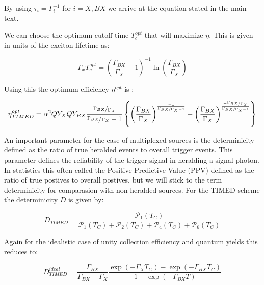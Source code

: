 \documentclass[reprint,onecolumn]{revtex4-1}
\begin{document}
By using $\tau_{i}=\Gamma_{i}^{-1}$ for $i=X,BX$ we arrive at the
equation stated in the main text.

We can choose the optimum cutoff time $T_{c}^{opt}$ that will maximize
$\eta$. This is given in units of the exciton lifetime as:

\begin{equation*}
\Gamma_{x}T_{c}^{opt}=\left(\frac{\Gamma_{BX}}{\Gamma_{X}}-1\right)^{-1}\ln\left(\frac{\Gamma_{BX}}{\Gamma_{X}}\right)\label{eq:tcopt}
\end{equation*}

Using this the optimum efficiency $\eta^{opt}$ is :

\begin{equation*}
\eta_{TIMED}^{opt}=\alpha^{2}QY_{X}QY_{BX}\frac{\nicefrac{\Gamma_{BX}}{\Gamma_{X}}}{\nicefrac{\Gamma_{BX}}{\Gamma_{X}}-1}\left\{ \left(\frac{\Gamma_{BX}}{\Gamma_{X}}\right)^{\frac{-1}{\nicefrac{\Gamma_{BX}}{\Gamma_{X}}-1}}-\left(\frac{\Gamma_{BX}}{\Gamma_{X}}\right)^{\frac{-\nicefrac{\Gamma_{BX}}{\Gamma_{X}}}{\nicefrac{\Gamma_{BX}}{\Gamma_{X}}-1}}\right\} \label{eq:etaopt}
\end{equation*}

An important parameter for the case
of multiplexed sources is the determinicity defined as the ratio of
true heralded events to overall trigger events. This parameter defines
the reliability of the trigger signal in heralding a signal photon.
In statistics this often called the Positive Predictive Value (PPV)
defined as the ratio of true postives to overall postives, but we
will stick to the term determinicity for comparasion with non-heralded
sources. For the TIMED scheme the determinicity $D$ is given by:

\begin{equation*}
D_{TIMED}=\frac{\mathscr{\mathcal{\mathscr{P}}}_{1}(T_{C})}{\mathscr{\mathcal{\mathscr{P}}}_{1}(T_{C})+\mathscr{\mathcal{\mathscr{P}}}_{2}(T_{C})+\mathscr{\mathcal{\mathscr{P}}}_{4}(T_{C})+\mathscr{\mathcal{\mathscr{P}}}_{6}(T_{C})}
\end{equation*}

Again for the idealistic case of unity collection efficiency and quantum
yields this reduces to:

\begin{equation*}
D_{TIMED}^{ideal}=\frac{\Gamma_{BX}}{\Gamma_{BX}-\Gamma_{X}}\frac{\exp\left(-\Gamma_{X}T_{C}\right)-\exp\left(-\Gamma_{BX}T_{C}\right)}{1-\exp\left(-\Gamma_{BX}T\right)}
\end{equation*}
\end{document}
